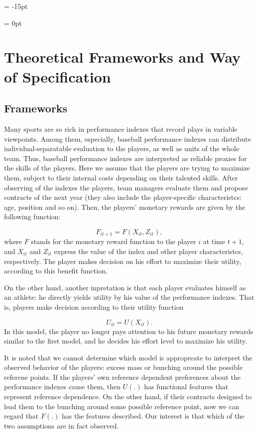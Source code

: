 \documentclass[dvipdfmx, 12pt]{article}
\begin{document}
\leftskip = -15pt
\begin{table}
  
\end{table}
\leftskip = 0pt

\section{Theoretical Frameworks and Way of Specification}

\subsection{Frameworks}

Many sports are so rich in performance indexes that record plays in variable viewpoints. Among them, especially, baseball performance indexes can distribute individual-separatable evaluation to the players, as well as units of the whole team. Thus, baseball performance indexes are interpreted as reliable proxies for the skills of the players. Here we assume that the players are trying to maximize them, subject to their internal costs depending on their talented skills. After observing of the indexes the players, team managers evaluate them and propose contracts of the next year (they also include the player-specific characteristcs: age, position and so on). Then, the players' monetary rewards are given by the following function:

\[
F_{it+1} = F(X_{it}, Z_{it}),
\]
where $F$ stands for the monetary reward function to the player $i$ at time $t+1$, and $X_{it}$ and $Z_{it}$ express the value of the index and other player characteristcs, respectively. The player makes decision on his effort to maximize their utility, according to this benefit function.

On the other hand, another inpretation is that each player evaluates himself as an athlete: he directly yields utility by his value of the performance indexes. That is, players make decision according to their utility function

\[
U_{it} = U(X_{it}).
\]
In this model, the player no longer pays attention to his future monetary rewards similar to the first model, and he decides his effort level to maximize his utility.

It is noted that we cannot determine which model is appropreate to interpret the observed behavior of the players: excess mass or bunching around the possible referene points. If the players' own reference dependent preferences about the performance indexes cause them,  then $U(.)$ has functional features that represent reference dependence. On the other hand, if their contracts designed to lead them to the bunching around some possible reference point, now we can regard that $F(.)$ has the features described. Our interest is that which of the two assumptions are in fact observed.
\end{document}
